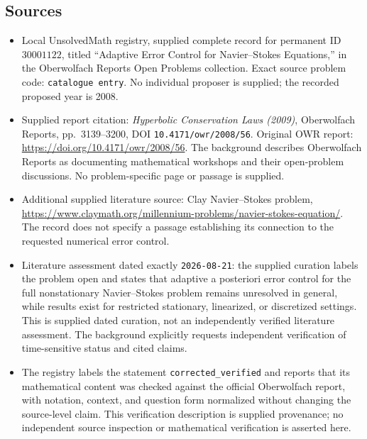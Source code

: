 \documentclass[11pt]{article}
\begin{document}
\subsection{Sources}
\begin{itemize}
\item Local UnsolvedMath registry, supplied complete record for permanent ID \(30001122\), titled ``Adaptive Error Control for Navier--Stokes Equations,'' in the Oberwolfach Reports Open Problems collection. Exact source problem code: \texttt{catalogue entry}. No individual proposer is supplied; the recorded proposed year is 2008.
\item Supplied report citation: \emph{Hyperbolic Conservation Laws (2009)}, Oberwolfach Reports, pp.~3139--3200, DOI \texttt{10.4171/owr/2008/56}. Original OWR report: \url{https://doi.org/10.4171/owr/2008/56}. The background describes Oberwolfach Reports as documenting mathematical workshops and their open-problem discussions. No problem-specific page or passage is supplied.
\item Additional supplied literature source: Clay Navier--Stokes problem, \url{https://www.claymath.org/millennium-problems/navier-stokes-equation/}. The record does not specify a passage establishing its connection to the requested numerical error control.
\item Literature assessment dated exactly \texttt{2026-08-21}: the supplied curation labels the problem open and states that adaptive a posteriori error control for the full nonstationary Navier--Stokes problem remains unresolved in general, while results exist for restricted stationary, linearized, or discretized settings. This is supplied dated curation, not an independently verified literature assessment. The background explicitly requests independent verification of time-sensitive status and cited claims.
\item The registry labels the statement \texttt{corrected\_verified} and reports that its mathematical content was checked against the official Oberwolfach report, with notation, context, and question form normalized without changing the source-level claim. This verification description is supplied provenance; no independent source inspection or mathematical verification is asserted here.
\end{itemize}
\end{document}
